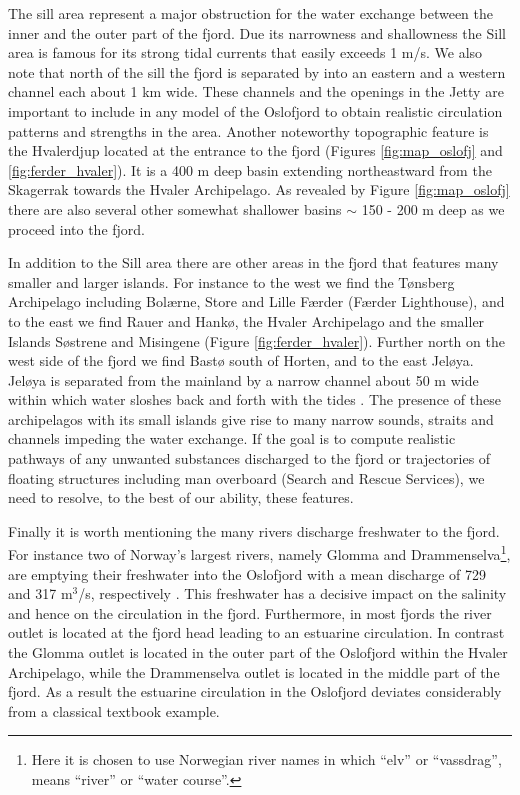 The sill area represent a major obstruction for the water exchange between the inner and the outer part of the fjord. Due its narrowness and shallowness the {\DR} Sill area is famous for its strong tidal currents that easily exceeds 1 m/s. We also note that north of the sill the fjord is separated by {\HAA} into an eastern and a western channel each about 1 km wide. These channels and the openings in the Jetty are important to include in any model of the Oslofjord to obtain realistic circulation patterns and strengths in the area. Another noteworthy topographic feature is the Hvalerdjup located at the entrance to the fjord (Figures \ref{fig:map_oslofj} and \ref{fig:ferder_hvaler}). It is a 400 m deep basin extending northeastward from the Skagerrak towards the Hvaler Archipelago. As revealed by Figure \ref{fig:map_oslofj} there are also several other somewhat shallower basins $\sim$ 150 - 200 m deep as we proceed into the fjord. 
 

In addition to the {\DR} Sill area there are other areas in the fjord that features many smaller and larger islands. For instance to the west we find the T{\o}nsberg Archipelago including Bol{\ae}rne, Store and Lille F{\ae}rder (F{\ae}rder Lighthouse), and to the east we find Rauer and Hank{\o}, the Hvaler Archipelago and the smaller Islands S{\o}strene and Misingene (Figure \ref{fig:ferder_hvaler}). Further north on the west side of the fjord we find Bast{\o} south of Horten, and to the east Jel{\o}ya. Jel{\o}ya is separated from the mainland by a narrow channel about 50 m wide within which water sloshes back and forth with the tides \citep{hjelm:etal:2014}. The presence of these archipelagos with its small islands give rise to many narrow sounds, straits and channels impeding the water exchange. If the goal is to compute realistic pathways of any unwanted substances discharged to the fjord or trajectories of floating structures including man overboard (Search and Rescue Services), we need to resolve, to the best of our ability, these features. 

Finally it is worth mentioning the many rivers discharge freshwater to the fjord. For instance two of Norway's largest rivers, namely Glomma and Drammenselva\footnote{Here it is chosen to use Norwegian river names in which ``elv'' or ``vassdrag'', means ``river'' or ``water course''.}, are emptying their freshwater into the Oslofjord with a mean discharge of 729 and 317 m$^3$/s, respectively \citep{milli:etal:2011}. This freshwater has a decisive impact on the salinity and hence on the circulation in the fjord. Furthermore, in most fjords the river outlet is located at the fjord head leading to an estuarine circulation. In contrast the Glomma outlet is located in the outer part of the Oslofjord within the Hvaler Archipelago, while the Drammenselva outlet is located in the middle part of the fjord. As a result the estuarine circulation in the Oslofjord deviates considerably from a classical textbook example.        


